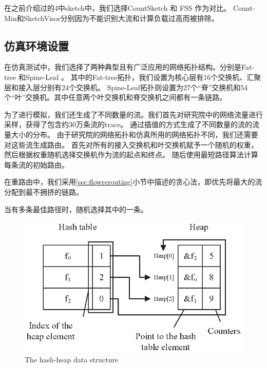 在之前介绍过的4中sketch中，我们选择CountSketch \cite{charikar2004finding} 和 FSS \cite{homem2010finding}作为对比。
Count-Min\cite{cormode2004improved}和SketchVisor\cite{huang2017sketchvisor}分别因为不能识别大流和计算负载过高而被排除。

\subsection{仿真环境设置}\label{subsec:simulationsetting}

在仿真测试中，我们选择了两种典型且有广泛应用的网络拓扑结构。分别是Fat-tree \cite{al2008scalable}和Spine-Leaf \cite{alizadeh2013data}。
其中的Fat-tree拓扑，我们设置为核心层有16个交换机、汇聚层和接入层分别有24个交换机。
Spine-Leaf拓扑则设置为27个“脊”交换机和54个“叶”交换机。其中任意两个叶交换机和脊交换机之间都有一条链路。

为了进行模拟，我们还生成了不同数量的流。我们首先对研究院中的网络流量进行采样，获得了包含约30万条流的trace。
通过插值的方式生成了不同数量的流的流量大小的分布。
由于研究院的网络拓扑和仿真所用的网络拓扑不同，我们还需要对这些流生成路由。
首先对所有的接入交换机和叶交换机赋予一个随机的权重，然后根据权重随机选择交换机作为流的起点和终点。
随后使用最短路径算法计算每条流的初始路由。

在重路由中，我们采用\ref{sec:flowrerouting}小节中描述的贪心法，即优先将最大的流分配到最不拥挤的链路。

当有多条最佳路径时，随机选择其中的一条。

\begin{figure}
    \centering
    \includegraphics[width=\linewidth]{fig/hashheap.eps}
    \caption{\textnormal{The hash-heap data structure}}
    \label{fig:hashheap}
 \end{figure}

